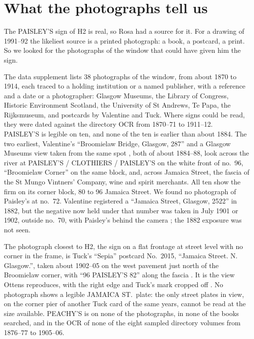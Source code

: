 \documentclass[10pt,a4paper]{article}
\begin{document}
\section{What the photographs tell us}\label{sec:photos}
The PAISLEY'S sign of H2 is real, so Rosa had a source for it. For a drawing of 1991--92 the likeliest source is a printed photograph: a book, a postcard, a print. So we looked for the photographs of the window that could have given him the sign.

The data supplement lists 38 photographs of the window, from about 1870 to 1914, each traced to a holding institution or a named publisher, with a reference and a date or a photographer: Glasgow Museums, the Library of Congress, Historic Environment Scotland, the University of St Andrews, Te Papa, the Rijksmuseum, and postcards by Valentine and Tuck. Where signs could be read, they were dated against the directory OCR from 1870--71 to 1911--12. PAISLEY'S is legible on ten, and none of the ten is earlier than about 1884. The two earliest, Valentine's ``Broomielaw Bridge, Glasgow, 287'' \citep{valentine287} and a Glasgow Museums view taken from the same spot \citep{tgse00176}, both of about 1884--88, look across the river at PAISLEY'S / CLOTHIERS / PAISLEY'S on the white front of no.~96, ``Broomielaw Corner'' on the same block, and, across Jamaica Street, the fascia of the St Mungo Vintners' Company, wine and spirit merchants. All ten show the firm on its corner block, 80 to 96 Jamaica Street. We found no photograph of Paisley's at no.~72. Valentine registered a ``Jamaica Street, Glasgow, 2522'' in 1882, but the negative now held under that number was taken in July 1901 or 1902, outside no.~70, with Paisley's behind the camera \citep{standrews2522}; the 1882 exposure was not seen.

The photograph closest to H2, the sign on a flat frontage at street level with no corner in the frame, is Tuck's ``Sepia'' postcard No.~2015, ``Jamaica Street. N. Glasgow.'', taken about 1902--05 on the west pavement just north of the Broomielaw corner, with ``96 PAISLEY'S 82'' along the fascia \citep{tuck2015}. It is the view Ottens reproduces, with the right edge and Tuck's mark cropped off \citep{ottens2020neverwas}. No photograph shows a legible JAMAICA ST.\ plate: the only street plates in view, on the corner pier of another Tuck card of the same years, cannot be read at the size available. PEACHY'S is on none of the photographs, in none of the books searched, and in the OCR of none of the eight sampled directory volumes from 1876--77 to 1905--06.
\end{document}
